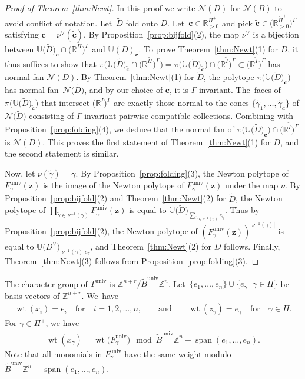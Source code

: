 \documentclass[10pt,a4paper]{amsart}
\def\R{{\mathbb R}}
\def\Z{{\mathbb Z}}
\def\univ{{\operatorname{univ}}}
\def\tB{{\tilde B}}
\def\sp{\operatorname{span}}
\def\wt{\operatorname{wt}}
\def\U{{\mathbb U}}
\def\tD{{\tilde D}}
\def\tB{{\tilde B}}
\def\tc{{\tilde \c}}
\def\tI{{\tilde I}}
\def\z{{\mathbf z}}
\def\N{{\mathcal{N}}}
\def\tgamma{{\tilde \gamma}}
\def\tPi{{\tilde \Pi}}
\def\c{{\mathbf c}}
\numberwithin{equation}{section}
\begin{document}
\begin{proof}[Proof of Theorem~\ref{thm:Newt}]
In this proof we write $\N(D)$ for $\N(B)$ to avoid conflict of notation. Let~$\tD$ fold onto $D$. Let~$\c \in \R_{>0}^{\Pi^+}$ and pick $\tc \in \big(\R_{>0}^{\tPi^+}\big)^\Gamma$ satisfying $\c = \nu^\vee(\tc)$. By Proposition~\ref{prop:bijfold}(2), the map $\nu^\vee$ is a bijection between $\U\big(\tD\big)_{\tc} \cap \big(\R^{\tPi}\big)^\Gamma$ and $\U(D)_{\c}$. To prove Theorem~\ref{thm:Newt}(1) for $D$, it thus suffices to show that $\pi\big(\U\big(\tD\big)_{\tc} \cap \big(\R^{\tPi}\big)^\Gamma\big) = \pi\big(\U\big(\tD\big)_{\tc}\big) \cap \big(\R^{\tI}\big)^\Gamma \subset \big(\R^{\tI}\big)^\Gamma$ has normal fan $\N(D)$.
By Theorem~\ref{thm:Newt}(1) for $\tD$, the polytope $\pi\big(\U\big(\tD\big)_{\tc}\big)$ has normal fan~$\N\big(\tD\big)$, and by our choice of $\tc$, it is $\Gamma$-invariant. The~faces of $\pi\big(\U\big(\tD\big)_{\tc}\big)$ that intersect $\big(\R^{\tI}\big)^\Gamma$ are exactly those normal to the cones $\{\tgamma_1,\dots,\tgamma_a\}$ of $\N\big(\tD\big)$ consisting of $\Gamma$-invariant pairwise compatible collections. Combining with Proposition~\ref{prop:folding}(4), we deduce that the normal fan of $\pi\big(\U\big(\tD\big)_{\tc}\big) \cap \big(\R^{\tI}\big)^\Gamma$ is $\N(D)$. This proves the first statement of Theorem~\ref{thm:Newt}(1) for $D$, and the second statement is similar.

Now, let $\nu(\tgamma) = \gamma$. By Proposition~\ref{prop:folding}(3), the Newton polytope of $F_\gamma^\univ(\z)$ is the image of the Newton polytope of $F_\tgamma^\univ(\z)$ under the map $\nu$. By Proposition~\ref{prop:bijfold}(2) and Theorem~\ref{thm:Newt}(2) for $\tD$, the Newton polytope of $\prod_{\tgamma \in \nu^{-1}(\gamma)} F_\tgamma^\univ(\z)$ is equal to $\U\big(\tD\big)_{\sum_{\tgamma \in \nu^{-1}(\gamma)} e_{\tgamma}}$. Thus by Proposition~\ref{prop:bijfold}(2), the Newton polytope of $(F_\gamma^\univ(\z))^{|\nu^{-1}(\gamma)|}$ is equal to $\U\big(D^\vee\big)_{|\nu^{-1}(\gamma)| e_{\gamma}}$, and Theorem~\ref{thm:Newt}(2) for $D$ follows. Finally, Theorem~\ref{thm:Newt}(3) follows from Proposition~\ref{prop:folding}(3).
\end{proof}

\bigskip{}
The character group of $T^\univ$ is $\Z^{n+r}/\tB^\univ \Z^n$. Let~$\{e_1,\dots,e_n\} \cup \{e_\gamma \,|\, \gamma \in \Pi\}$ be basis vectors of $\Z^{n+r}$. We~have
\begin{gather}\label{eq:wtuniv}
\wt(x_i) = e_i\quad \text{for}\quad i = 1,2,\dots,n, \qquad \text{and} \qquad
\wt(z_\gamma) = e_\gamma\quad \text{for}\quad \gamma \in \Pi.
\end{gather}
For $\gamma \in \Pi^+$, we have
\begin{gather*}
\wt(x_\gamma) = \wt\big(F^\univ_\gamma\big) \mod \tB^\univ \Z^n + \sp({e_1,\dots,e_n}).
\end{gather*}
Note that all monomials in $F^\univ_\gamma$ have the same weight modulo $\tB^\univ \Z^n + \sp({e_1,\dots,e_n})$.
\end{document}
